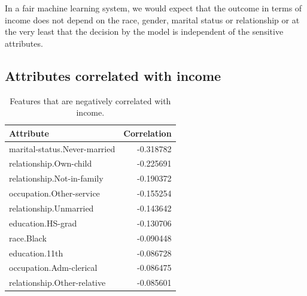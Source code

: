 In a fair machine learning system, we would expect that the outcome in terms of income does not depend on the race, gender, marital status or relationship or at the very least that the decision by the model is independent of the sensitive attributes.

\subsection{Attributes correlated with income}

\begin{table}
    \centering
    \begin{tabular}{lr}
        \toprule
        Attribute &  Correlation \\
        \midrule
        marital-status.Never-married &    -0.318782 \\
        relationship.Own-child       &    -0.225691 \\
        relationship.Not-in-family   &    -0.190372 \\
        occupation.Other-service     &    -0.155254 \\
        relationship.Unmarried       &    -0.143642 \\
        education.HS-grad            &    -0.130706 \\
        race.Black                   &    -0.090448 \\
        education.11th               &    -0.086728 \\
        occupation.Adm-clerical      &    -0.086475 \\
        relationship.Other-relative  &    -0.085601 \\
        \bottomrule
    \end{tabular}
    \caption{Features that are negatively correlated with income.}
    \label{fig:negative_income_correaltion}
\end{table}

